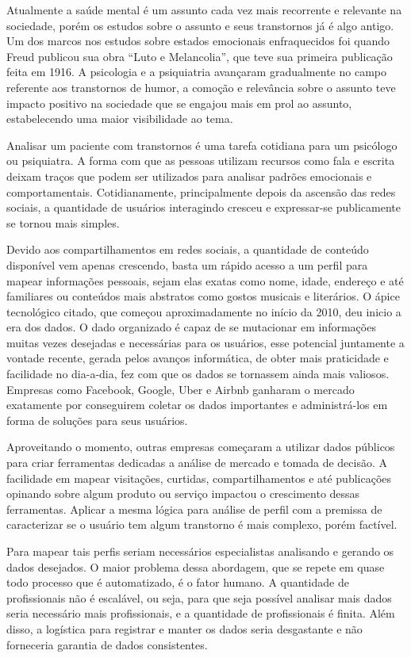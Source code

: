 Atualmente a saúde mental é um assunto cada vez mais recorrente e relevante na sociedade, porém os estudos sobre o assunto e seus transtornos já é algo antigo. Um dos marcos nos estudos sobre estados emocionais enfraquecidos foi quando Freud publicou sua obra “Luto e Melancolia”, que teve sua primeira publicação feita em 1916. A psicologia e a psiquiatria avançaram gradualmente no campo referente aos transtornos de humor, a comoção e relevância sobre o assunto teve impacto positivo na sociedade que se engajou mais em prol ao assunto, estabelecendo uma maior visibilidade ao tema.

Analisar um paciente com transtornos é uma tarefa cotidiana para um psicólogo ou psiquiatra. A forma com que as pessoas utilizam recursos como fala e escrita deixam traços que podem ser utilizados para analisar padrões emocionais e comportamentais. Cotidianamente, principalmente depois da ascensão das redes sociais, a quantidade de usuários interagindo cresceu e expressar-se publicamente se tornou mais simples.

Devido aos compartilhamentos em redes sociais, a quantidade de conteúdo disponível vem apenas crescendo, basta um rápido acesso a um perfil para mapear informações pessoais, sejam elas exatas como nome, idade, endereço e até familiares ou conteúdos mais abstratos como gostos musicais e literários. O ápice tecnológico citado, que começou aproximadamente no início da 2010, deu inicio a era dos dados. O dado organizado é capaz de se mutacionar em informações muitas vezes desejadas e necessárias para os usuários, esse potencial juntamente a vontade recente, gerada pelos avanços informática, de obter mais praticidade e facilidade no dia-a-dia, fez com que os dados se tornassem ainda mais valiosos. Empresas como Facebook, Google, Uber e Airbnb ganharam o mercado exatamente por conseguirem coletar os dados importantes e administrá-los em forma de soluções para seus usuários.

Aproveitando o momento, outras empresas começaram a utilizar dados públicos para criar ferramentas dedicadas a análise de mercado e tomada de decisão. A facilidade em mapear visitações, curtidas, compartilhamentos e até publicações opinando sobre algum produto ou serviço impactou o crescimento dessas ferramentas. Aplicar a mesma lógica para análise de perfil com a premissa de caracterizar se o usuário tem algum transtorno é mais complexo, porém factível.

Para mapear tais perfis seriam necessários especialistas analisando e gerando os dados desejados. O maior problema dessa abordagem, que se repete em quase todo processo que é automatizado, é o fator humano. A quantidade de profissionais não é escalável, ou seja, para que seja possível analisar mais dados seria necessário mais profissionais, e a quantidade de profissionais é finita. Além disso, a logística para registrar e manter os dados seria desgastante e não forneceria garantia de dados consistentes.


